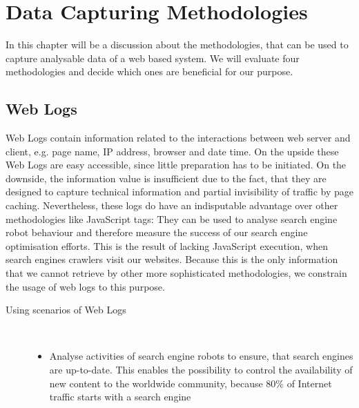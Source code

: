 \section{Data Capturing Methodologies} %
\label{sec:methodologies}
In this chapter will be a discussion about the methodologies, that can be used to capture analysable data of a web based system. We will evaluate four methodologies and decide which ones are beneficial for our purpose.


\subsection{Web Logs} %
\label{sub:web_logs}
Web Logs contain information related to the interactions between web server and client, e.g. page name, IP address, browser and date time. On the upside these Web Logs are easy accessible, since little preparation has to be initiated. On the downside, the information value is insufficient due to the fact, that they are designed to capture technical information and partial invisibility of traffic by page caching. Nevertheless, these logs do have an indisputable advantage over other methodologies like JavaScript tags: They can be used to analyse search engine robot behaviour and therefore measure the success of our search engine optimisation efforts. This is the result of lacking JavaScript execution, when search engines crawlers visit our websites. Because this is the only information that we cannot retrieve by other more sophisticated methodologies, we constrain the usage of web logs to this purpose.\citep[p. 26-27]{Kaushik07} 

\begin{description}
   \item[Using scenarios of Web Logs]~\par
   \begin{itemize}
      \item Analyse activities of search engine robots to ensure, that search engines are up-to-date. This enables the possibility to control the availability of new content to the worldwide community, because 80\% of Internet traffic starts with a search engine\citep[p. 147]{Kaushik07}
   \end{itemize}
\end{description}


